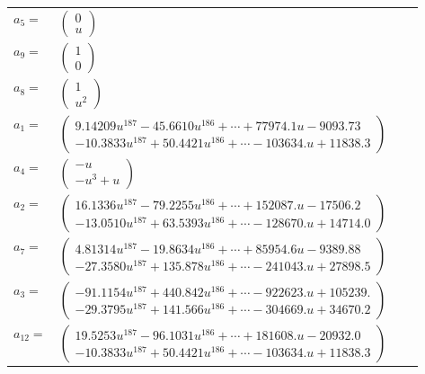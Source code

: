 \documentclass[1p]{elsarticle_modified}
\theoremstyle{definition}
\begin{document}
\begin{tabular}{m{7pt} m{180pt} m{7pt} m{180pt} }
\flushright $a_{5}=$&$\begin{pmatrix}0\\u\end{pmatrix}$ \\
\flushright $a_{9}=$&$\begin{pmatrix}1\\0\end{pmatrix}$ \\
\flushright $a_{8}=$&$\begin{pmatrix}1\\u^2\end{pmatrix}$ \\
\flushright $a_{1}=$&$\begin{pmatrix}9.14209 u^{187}-45.6610 u^{186}+\cdots+77974.1 u-9093.73\\-10.3833 u^{187}+50.4421 u^{186}+\cdots-103634. u+11838.3\end{pmatrix}$ \\
\flushright $a_{4}=$&$\begin{pmatrix}- u\\- u^3+u\end{pmatrix}$ \\
\flushright $a_{2}=$&$\begin{pmatrix}16.1336 u^{187}-79.2255 u^{186}+\cdots+152087. u-17506.2\\-13.0510 u^{187}+63.5393 u^{186}+\cdots-128670. u+14714.0\end{pmatrix}$ \\
\flushright $a_{7}=$&$\begin{pmatrix}4.81314 u^{187}-19.8634 u^{186}+\cdots+85954.6 u-9389.88\\-27.3580 u^{187}+135.878 u^{186}+\cdots-241043. u+27898.5\end{pmatrix}$ \\
\flushright $a_{3}=$&$\begin{pmatrix}-91.1154 u^{187}+440.842 u^{186}+\cdots-922623. u+105239.\\-29.3795 u^{187}+141.566 u^{186}+\cdots-304669. u+34670.2\end{pmatrix}$ \\
\flushright $a_{12}=$&$\begin{pmatrix}19.5253 u^{187}-96.1031 u^{186}+\cdots+181608. u-20932.0\\-10.3833 u^{187}+50.4421 u^{186}+\cdots-103634. u+11838.3\end{pmatrix}$ \\

\end{tabular}
\end{document}
